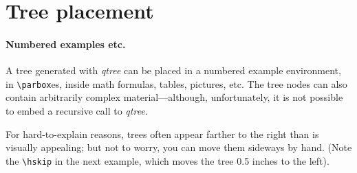 \documentclass[11pt]{article}
\begin{document}
\section{Tree placement}

\paragraph*{Numbered examples etc.}
A tree generated with \emph{qtree} can be placed in a numbered example
environment, in 
\verb|\parbox|es, inside math formulas, tables, pictures, etc.  The tree nodes
can also contain arbitrarily complex material---although, unfortunately, it is
not possible to embed a recursive call to {\it qtree.\/} 

For hard-to-explain reasons, trees often appear farther to the right than is
visually appealing; but not to worry, you can move them sideways by hand.
(Note the \verb|\hskip| in the next example, which moves the tree 0.5 inches
to the left).


\end{document}
